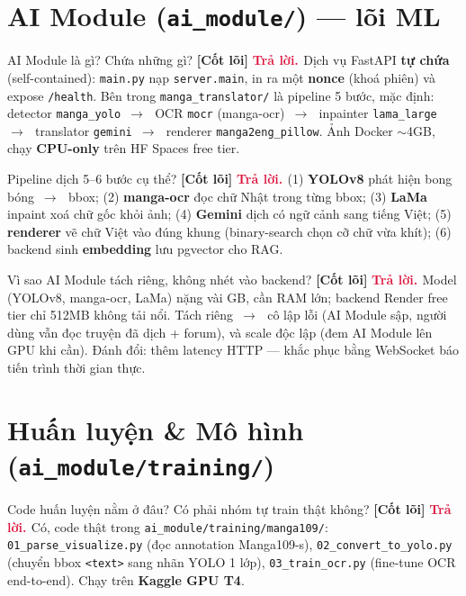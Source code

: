 \documentclass[11pt]{article}
\newcommand{\arr}{\,\ensuremath{\rightarrow}\,}
\newcommand{\code}[1]{\texttt{\small #1}}
\newcommand{\B}[1]{\textbf{#1}}
\newcommand{\tagCore}{\textcolor{steel}{\footnotesize\textbf{[Cốt lõi]}}}
\newcommand{\A}{\textbf{\textcolor{crimson}{Trả lời. }}}
\begin{document}
\section{AI Module (\texttt{ai\_module/}) --- lõi ML}

\begin{qa}{AI Module là gì? Chứa những gì? \tagCore}
\A Dịch vụ FastAPI \B{tự chứa} (self-contained): \code{main.py} nạp \code{server.main}, in ra một \B{nonce} (khoá phiên) và expose \code{/health}. Bên trong \code{manga\_translator/} là pipeline 5 bước, mặc định: detector \code{manga\_yolo} \arr\ OCR \code{mocr} (manga-ocr) \arr\ inpainter \code{lama\_large} \arr\ translator \code{gemini} \arr\ renderer \code{manga2eng\_pillow}. Ảnh Docker $\sim$4GB, chạy \B{CPU-only} trên HF Spaces free tier.
\end{qa}

\begin{qa}{Pipeline dịch 5--6 bước cụ thể? \tagCore}
\A (1) \B{YOLOv8} phát hiện bong bóng \arr\ bbox; (2) \B{manga-ocr} đọc chữ Nhật trong từng bbox; (3) \B{LaMa} inpaint xoá chữ gốc khỏi ảnh; (4) \B{Gemini} dịch có ngữ cảnh sang tiếng Việt; (5) \B{renderer} vẽ chữ Việt vào đúng khung (binary-search chọn cỡ chữ vừa khít); (6) backend sinh \B{embedding} lưu pgvector cho RAG.
\end{qa}

\begin{qa}{Vì sao AI Module tách riêng, không nhét vào backend? \tagCore}
\A Model (YOLOv8, manga-ocr, LaMa) nặng vài GB, cần RAM lớn; backend Render free tier chỉ 512MB không tải nổi. Tách riêng \arr\ cô lập lỗi (AI Module sập, người dùng vẫn đọc truyện đã dịch + forum), và scale độc lập (đem AI Module lên GPU khi cần). Đánh đổi: thêm latency HTTP --- khắc phục bằng WebSocket báo tiến trình thời gian thực.
\end{qa}

\section{Huấn luyện \& Mô hình (\texttt{ai\_module/training/})}

\begin{qa}{Code huấn luyện nằm ở đâu? Có phải nhóm tự train thật không? \tagCore}
\A Có, code thật trong \code{ai\_module/training/manga109/}: \code{01\_parse\_visualize.py} (đọc annotation Manga109-s), \code{02\_convert\_to\_yolo.py} (chuyển bbox \code{<text>} sang nhãn YOLO 1 lớp), \code{03\_train\_ocr.py} (fine-tune OCR end-to-end). Chạy trên \B{Kaggle GPU T4}.
\end{qa}
\end{document}
